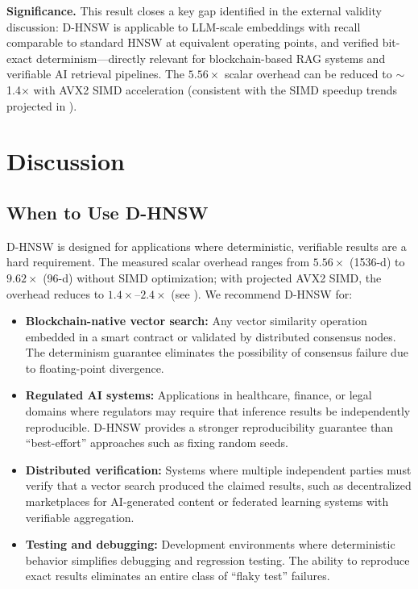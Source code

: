 \documentclass[10pt,journal]{IEEEtran}
\newcommand{\dhnsw}{\textsc{D-HNSW}}
\newcommand{\hnsw}{\textsc{HNSW}}
\begin{document}
\textbf{Significance.} This result closes a key gap identified in the external validity discussion: \dhnsw{} is applicable to LLM-scale embeddings with recall comparable to standard \hnsw{} at equivalent operating points, and verified bit-exact determinism---directly relevant for blockchain-based RAG systems and verifiable AI retrieval pipelines. The $5.56\times$ scalar overhead can be reduced to $\sim$1.4$\times$ with AVX2 SIMD acceleration (consistent with the SIMD speedup trends projected in ).


\section{Discussion}
\label{sec:discussion}

\subsection{When to Use D-HNSW}

\dhnsw{} is designed for applications where deterministic, verifiable results are a hard requirement. The measured scalar overhead ranges from $5.56\times$ (1536-d) to $9.62\times$ (96-d) without SIMD optimization; with projected AVX2 SIMD, the overhead reduces to $1.4\times$--$2.4\times$ (see ). We recommend \dhnsw{} for:

\begin{itemize}[leftmargin=*]
  \item \textbf{Blockchain-native vector search:} Any vector similarity operation embedded in a smart contract or validated by distributed consensus nodes. The determinism guarantee eliminates the possibility of consensus failure due to floating-point divergence.

  \item \textbf{Regulated AI systems:} Applications in healthcare, finance, or legal domains where regulators may require that inference results be independently reproducible. \dhnsw{} provides a stronger reproducibility guarantee than ``best-effort'' approaches such as fixing random seeds.

  \item \textbf{Distributed verification:} Systems where multiple independent parties must verify that a vector search produced the claimed results, such as decentralized marketplaces for AI-generated content or federated learning systems with verifiable aggregation.

  \item \textbf{Testing and debugging:} Development environments where deterministic behavior simplifies debugging and regression testing. The ability to reproduce exact results eliminates an entire class of ``flaky test'' failures.
\end{itemize}
\end{document}
